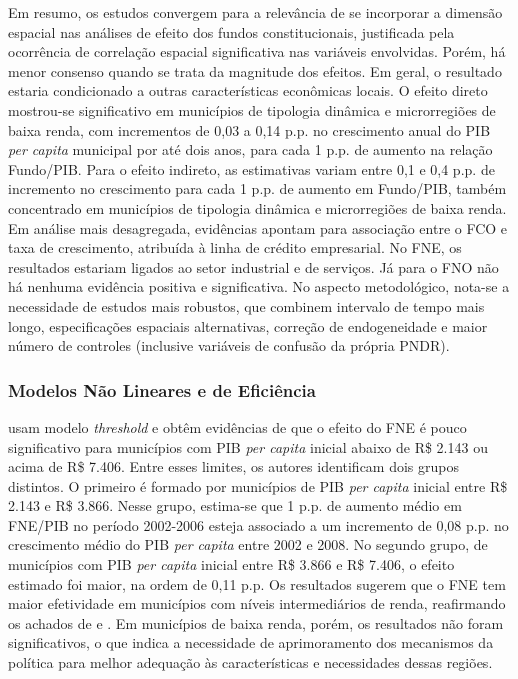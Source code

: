 Em resumo, os estudos convergem para a relevância de se incorporar a dimensão espacial nas análises de efeito dos fundos constitucionais, justificada pela ocorrência de correlação espacial significativa nas variáveis envolvidas. Porém, há menor consenso quando se trata da magnitude dos efeitos. Em geral, o resultado estaria condicionado a outras características econômicas locais. O efeito direto mostrou-se significativo em municípios de tipologia dinâmica e microrregiões de baixa renda, com incrementos de 0,03 a 0,14 p.p. no crescimento anual do PIB \textit{per capita} municipal por até dois anos, para cada 1 p.p. de aumento na relação Fundo/PIB. Para o efeito indireto, as estimativas variam entre 0,1 e 0,4 p.p. de incremento no crescimento para cada 1 p.p. de aumento em Fundo/PIB, também concentrado em municípios de tipologia dinâmica e microrregiões de baixa renda. Em análise mais desagregada, evidências apontam para associação entre o FCO e taxa de crescimento, atribuída à linha de crédito empresarial. No FNE, os resultados estariam ligados ao setor industrial e de serviços. Já para o FNO não há nenhuma evidência positiva e significativa. No aspecto metodológico, nota-se a necessidade de estudos mais robustos, que combinem intervalo de tempo mais longo, especificações espaciais alternativas, correção de endogeneidade e maior número de controles (inclusive variáveis de confusão da própria PNDR).

\subsubsection{Modelos Não Lineares e de Eficiência}

 usam modelo \textit{threshold} e obtêm evidências de que o efeito do FNE é pouco significativo para municípios com PIB \textit{per capita} inicial abaixo de R\$ 2.143 ou acima de R\$ 7.406. Entre esses limites, os autores identificam dois grupos distintos. O primeiro é formado por municípios de PIB \textit{per capita} inicial entre R\$ 2.143 e R\$ 3.866. Nesse grupo, estima-se que 1 p.p. de aumento médio em FNE/PIB no período 2002-2006 esteja associado a um incremento de 0,08 p.p. no crescimento médio do PIB \textit{per capita} entre 2002 e 2008. No segundo grupo, de municípios com PIB \textit{per capita} inicial entre R\$ 3.866 e R\$ 7.406, o efeito estimado foi maior, na ordem de 0,11 p.p. Os resultados sugerem que o FNE tem maior efetividade em municípios com níveis intermediários de renda, reafirmando os achados de  e . Em municípios de baixa renda, porém, os resultados não foram significativos, o que indica a necessidade de aprimoramento dos mecanismos da política para melhor adequação às características e necessidades dessas regiões.

